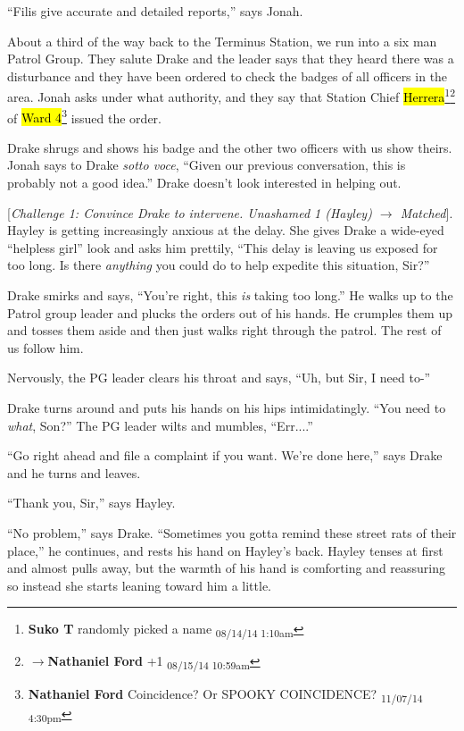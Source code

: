 ``Filis give accurate and detailed reports,'' says Jonah.



About a third of the way back to the Terminus Station, we run into a six man Patrol Group.  They salute Drake and the leader says that they heard there was a disturbance and they have been ordered to check the badges of all officers in the area.   Jonah asks under what authority, and they say that Station Chief \hl{Herrera}\footnote{\textbf{Suko T }randomly picked a name \textsubscript{08/14/14 1:10am}}\footnote{$\rightarrow$\textbf{Nathaniel Ford }+1 \textsubscript{08/15/14 10:59am}} of \hl{Ward 4}\footnote{\textbf{Nathaniel Ford }Coincidence? Or SPOOKY COINCIDENCE? \textsubscript{11/07/14 4:30pm}} issued the order.



Drake shrugs and shows his badge and the other two officers with us show theirs.  Jonah says to Drake \textit{sotto voce}, ``Given our previous conversation, this is probably not a good idea.''  Drake doesn't look interested in helping out.  



{[}\textit{Challenge 1: Convince Drake to intervene.  Unashamed 1 (Hayley) $\rightarrow$ Matched}{]}.  Hayley is getting increasingly anxious at the delay.  She gives Drake a wide-eyed ``helpless girl'' look and asks him prettily, ``This delay is leaving us exposed for too long.  Is there \textit{anything} you could do to help expedite this situation, Sir?''



Drake smirks and says, ``You're right, this \textit{is} taking too long.''  He walks up to the Patrol group leader and plucks the orders out of his hands.  He crumples them up and tosses them aside and then just walks right through the patrol.  The rest of us follow him. 



Nervously, the PG leader clears his throat and says, ``Uh, but Sir, I need to-''

Drake turns around and puts his hands on his hips intimidatingly.  ``You need to \textit{what}, Son?''  The PG leader wilts and mumbles, ``Err....''

``Go right ahead and file a complaint if you want.  We're done here,'' says Drake and he turns and leaves.

``Thank you, Sir,'' says Hayley.

``No problem,'' says Drake.  ``Sometimes you gotta remind these street rats of their place,'' he continues, and rests his hand on Hayley's back.  Hayley tenses at first and almost pulls away, but the warmth of his hand is comforting and reassuring so instead she starts leaning toward him a little.


